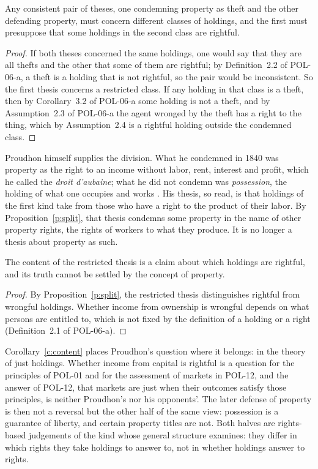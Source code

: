 \documentclass{situationist-preprint}
\begin{document}
\begin{proposition}\label{p:split}
Any consistent pair of theses, one condemning property as theft and the other defending property, must concern different classes of holdings, and the first must presuppose that some holdings in the second class are rightful.
\end{proposition}

\begin{proof}
If both theses concerned the same holdings, one would say that they are all thefts and the other that some of them are rightful; by Definition~2.2 of POL-06-a, a theft is a holding that is not rightful, so the pair would be inconsistent. So the first thesis concerns a restricted class. If any holding in that class is a theft, then by Corollary~3.2 of POL-06-a some holding is not a theft, and by Assumption~2.3 of POL-06-a the agent wronged by the theft has a right to the thing, which by Assumption~2.4 is a rightful holding outside the condemned class.
\end{proof}

Proudhon himself supplies the division. What he condemned in 1840 was property as the right to an income without labor, rent, interest and profit, which he called the \emph{droit d'aubaine}; what he did not condemn was \emph{possession}, the holding of what one occupies and works \citep{Proudhon1840}. His thesis, so read, is that holdings of the first kind take from those who have a right to the product of their labor. By Proposition~\ref{p:split}, that thesis condemns some property in the name of other property rights, the rights of workers to what they produce. It is no longer a thesis about property as such.

\begin{corollary}\label{c:content}
The content of the restricted thesis is a claim about which holdings are rightful, and its truth cannot be settled by the concept of property.
\end{corollary}

\begin{proof}
By Proposition~\ref{p:split}, the restricted thesis distinguishes rightful from wrongful holdings. Whether income from ownership is wrongful depends on what persons are entitled to, which is not fixed by the definition of a holding or a right (Definition~2.1 of POL-06-a).
\end{proof}

Corollary~\ref{c:content} places Proudhon's question where it belongs: in the theory of just holdings. Whether income from capital is rightful is a question for the principles of POL-01 and for the assessment of markets in POL-12, and the answer of POL-12, that markets are just when their outcomes satisfy those principles, is neither Proudhon's nor his opponents'. The later defense of property is then not a reversal but the other half of the same view: possession is a guarantee of liberty, and certain property titles are not. Both halves are rights-based judgements of the kind whose general structure \citet{Waldron1988} examines: they differ in which rights they take holdings to answer to, not in whether holdings answer to rights.
\end{document}
